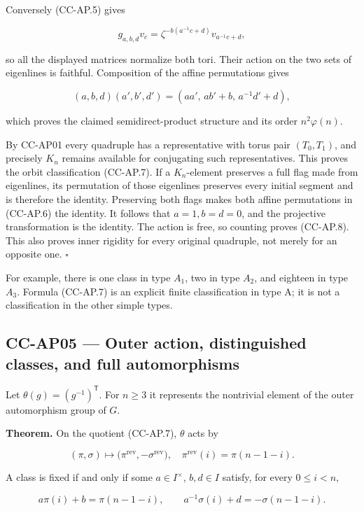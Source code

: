 Conversely (CC-AP.5) gives

\[
 g_{a,b,d}v_c
 =\zeta^{-b(a^{-1}c+d)}v_{a^{-1}c+d},
\]

so all the displayed matrices normalize both tori. Their action on the
two sets of eigenlines is faithful. Composition of the affine
permutations gives

\[
 (a,b,d)(a',b',d')
 =(aa',\,ab'+b,\,a^{-1}d'+d),
\]

which proves the claimed semidirect-product structure and its order
\(n^2\varphi(n)\).

By CC-AP01 every quadruple has a representative with torus pair
\((T_0,T_1)\), and precisely \(K_n\) remains available for conjugating
such representatives. This proves the orbit classification (CC-AP.7). If
a \(K_n\)-element preserves a full flag made from eigenlines, its
permutation of those eigenlines preserves every initial segment and is
therefore the identity. Preserving both flags makes both affine
permutations in (CC-AP.6) the identity. It follows that \(a=1,b=d=0\),
and the projective transformation is the identity. The action is free,
so counting proves (CC-AP.8). This also proves inner rigidity for every
original quadruple, not merely for an opposite one. \(\square\)

For example, there is one class in type \(A_1\), two in type \(A_2\),
and eighteen in type \(A_3\). Formula (CC-AP.7) is an explicit finite
classification in type A; it is not a classification in the other simple
types.

\subsection{CC-AP05 --- Outer action, distinguished classes, and full
automorphisms}\label{cc-ap05-outer-action-distinguished-classes-and-full-automorphisms}

Let \(\theta(g)=(g^{-1})^{\mathsf T}\). For \(n\geq3\) it represents the
nontrivial element of the outer automorphism group of \(G\).

\textbf{Theorem.} On the quotient (CC-AP.7), \(\theta\) acts by

\[
 (\pi,\sigma)\longmapsto
 \bigl(\pi^{\mathrm{rev}},-\sigma^{\mathrm{rev}}\bigr),
 \quad
 \pi^{\mathrm{rev}}(i)=\pi(n-1-i).
 \tag{CC-AP.10}
\]

A class is fixed if and only if some \(a\in I^\times\), \(b,d\in I\)
satisfy, for every \(0\leq i<n\),

\[
 a\pi(i)+b=\pi(n-1-i),\qquad
 a^{-1}\sigma(i)+d=-\sigma(n-1-i).
 \tag{CC-AP.11}
\]

